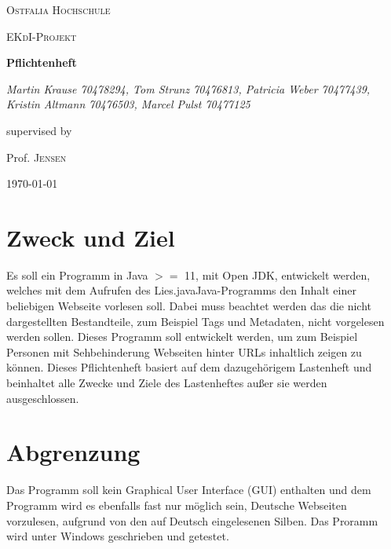 \documentclass[12pt]{scrartcl}
\begin{document}
\begin{titlepage}
	\centering
	{\scshape\LARGE Ostfalia Hochschule \par}
	\vspace{1cm}
	{\scshape\Large EKdI-Projekt\par}
	\vspace{1.5cm}
	{\huge\bfseries Pflichtenheft\par}
	\vspace{2cm}
	{\Large\itshape Martin Krause 70478294, Tom Strunz 70476813, Patricia Weber 70477439, Kristin Altmann 70476503, Marcel Pulst 70477125\par}
	\vfill
	supervised by\par
	Prof. \textsc{Jensen}

	\vfill

	{\large \today\par}
\end{titlepage}


\tableofcontents
\newpage


\section{Zweck und Ziel}
Es soll ein Programm in Java $>=$ 11, mit Open JDK, entwickelt werden, welches mit dem Aufrufen des \glqq Lies.java\grqq Java-Programms den Inhalt einer beliebigen Webseite vorlesen soll. Dabei muss beachtet werden das die nicht dargestellten Bestandteile, zum Beispiel Tags und Metadaten, nicht vorgelesen werden sollen. Dieses Programm soll entwickelt werden, um zum Beispiel Personen mit Sehbehinderung Webseiten hinter URLs inhaltlich zeigen zu können. Dieses Pflichtenheft basiert auf dem dazugehörigem Lastenheft und beinhaltet alle Zwecke und Ziele des Lastenheftes außer sie werden ausgeschlossen.

\section{Abgrenzung}
Das Programm soll kein Graphical User Interface (GUI) enthalten und dem Programm wird es ebenfalls fast nur möglich sein, Deutsche Webseiten vorzulesen, aufgrund von den auf Deutsch eingelesenen Silben. Das Proramm wird unter Windows geschrieben und getestet.
\end{document}
